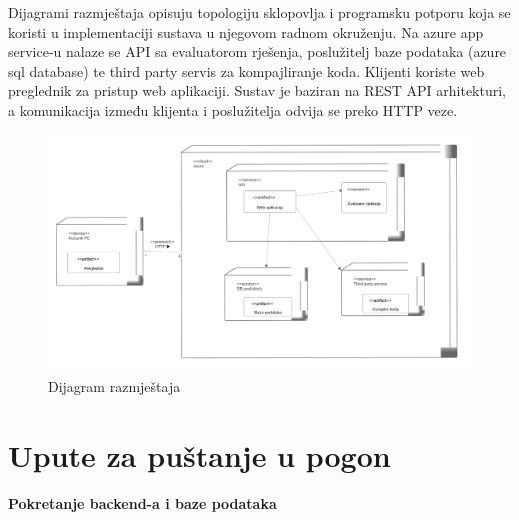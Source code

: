 			 Dijagrami razmještaja opisuju topologiju sklopovlja i programsku potporu koja se koristi u implementaciji sustava u njegovom radnom okruženju.
			 Na azure app service-u nalaze se API sa evaluatorom rješenja, poslužitelj baze podataka (azure sql database) te third party servis za kompajliranje koda.
			 Klijenti koriste web preglednik za pristup web aplikaciji. Sustav je baziran na REST API arhitekturi, a komunikacija između klijenta i poslužitelja odvija se preko HTTP veze.

			 
			
			\begin{figure}[H]
				\includegraphics[width=\linewidth]{slike/dijagram_razmjestaja.png} 
				\centering
				\caption{Dijagram razmještaja}
				\label{fig:razmjestaj}
			\end{figure}
			\eject 
		
		\section{Upute za puštanje u pogon}
		
			\textbf{Pokretanje backend-a i baze podataka}\\
			
